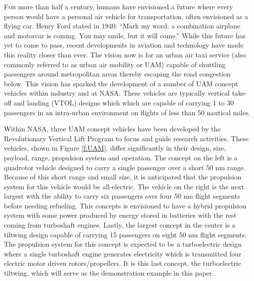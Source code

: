 \lettrine{F}{or} more than half a century, humans have envisioned a future where every person would have a personal air vehicle for transportation, often envisioned as a flying car.
Henry Ford stated in 1940: ``Mark my word: a combination airplane and motorcar is coming. You may smile, but it will come.''\cite{schilling2001looking}
While this future has yet to come to pass, recent developments in aviation and technology have made this reality closer than ever. 
The vision now is for an urban air taxi service (also commonly referred to as urban air mobility or UAM) capable of shuttling passengers around metropolitan areas thereby escaping the road congestion below.\cite{moore2003personal}
This vision has sparked the development of a number of UAM concept vehicles within industry and at NASA.
These vehicles are typically vertical take-off and landing (VTOL) designs which which are capable of carrying 1 to 30 passengers in an intra-urban environment on flights of less than 50 nautical miles. 

Within NASA, three UAM concept vehicles have been developed by the Revolutionary Vertical Lift Program to focus and guide research activities.\cite{johnson2018concept}
These vehicles, shown in Figure \ref{f:UAM}, differ significantly in their design, size, payload, range, propulsion system and operation.
The concept on the left is a quadrotor vehicle designed to carry a single passenger over a short 50 nm range.  
Because of this short range and small size, it is anticipated that the propulsion system for this vehicle would be all-electric.
The vehicle on the right is the next largest with the ability to carry six passengers over four 50 nm flight segments before needing refueling.
This concepts is envisioned to have a hybrid propulsion system with some power produced by energy stored in batteries with the rest coming from turboshaft engines.
Lastly, the largest concept in the center is a tiltwing design capable of carrying 15 passengers on eight 50 nm flight segments.
The propulsion system for this concept is expected to be a turboelectric design where a single turboshaft engine generates electricity which is transmitted four electric motor driven rotors/propellers.
It is this last concept, the turboelectric tiltwing, which will serve as the demonstration example in this paper.

